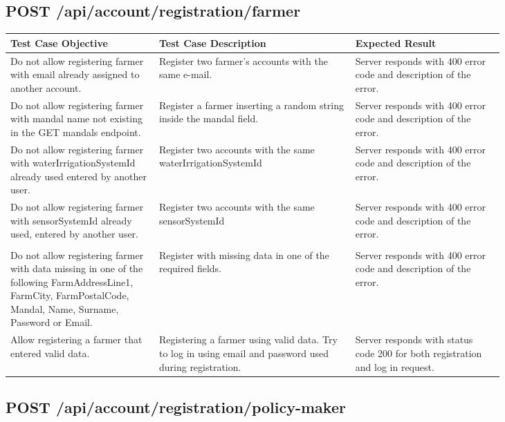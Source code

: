 \subsection{POST \slash api\slash account\slash registration\slash farmer}
\begin{longtable}{p{0.25\linewidth}p{0.33\linewidth}p{0.25\linewidth}}
	\toprule
	\textbf{Test Case Objective}   & \textbf{Test Case Description} & \textbf{Expected Result}\\
	\midrule
	Do not allow registering farmer with email already assigned to another account. & Register two farmer's accounts with the same e-mail. & Server responds with 400 error code and description of the error. \\
	Do not allow registering farmer with mandal name not existing in the GET mandals endpoint. & Register a farmer inserting a random string inside the mandal field. & Server responds with 400 error code and description of the error.\\
	Do not allow registering farmer with waterIrrigationSystemId already used entered by another user. & Register two accounts with the same waterIrrigationSystemId & Server responds with 400 error code and description of the error.\\
 	Do not allow registering farmer with sensorSystemId already used, entered by another user. & Register two accounts with the same sensorSystemId & Server responds with 400 error code and description of the error.\\& & \\
	 Do not allow registering farmer with data missing in one of the following FarmAddressLine1, FarmCity, FarmPostalCode, Mandal, Name, Surname, Password or Email. & Register with missing data in one of the required fields. & Server responds with 400 error code and description of the error.\\
	 Allow registering a farmer that entered valid data. & Registering a farmer using valid data. Try to log in using email and password used during registration. & Server responds with status code 200 for both registration and log in request.\\
	\bottomrule
\end{longtable}

\subsection{POST \slash api\slash account\slash registration\slash policy-maker}

